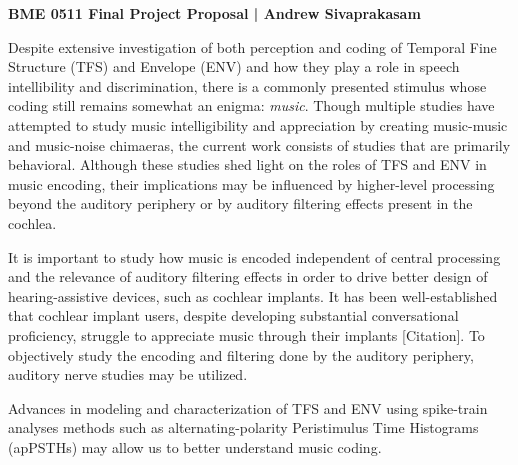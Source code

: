 \documentclass[9pt]{article}
\begin{document}
\begin{center}
{\Large \textbf{BME 0511 Final Project Proposal | Andrew Sivaprakasam}}
\end{center}

Despite extensive investigation of both perception and coding of Temporal Fine Structure (TFS) and Envelope (ENV) and how they play a role in speech intellibility and discrimination, there is a commonly presented stimulus whose coding still remains somewhat an enigma: \textit{music}. Though multiple studies have attempted to study music intelligibility and appreciation by creating music-music and music-noise chimaeras, the current work consists of studies that are primarily behavioral. Although these studies shed light on the roles of TFS and ENV in music encoding, their implications may be influenced by higher-level processing beyond the auditory periphery or by auditory filtering effects present in the cochlea. 

It is important to study how music is encoded independent of central processing and the relevance of auditory filtering effects in order to drive better design of hearing-assistive devices, such as cochlear implants. It has been well-established that cochlear implant users, despite developing substantial conversational proficiency, struggle to appreciate music through their implants [Citation]. To objectively study the encoding and filtering done by the auditory periphery, auditory nerve studies may be utilized.

Advances in modeling and characterization of TFS and ENV using spike-train analyses methods such as alternating-polarity Peristimulus Time Histograms (apPSTHs) may allow us to better understand music coding. 

 
\end{document}
